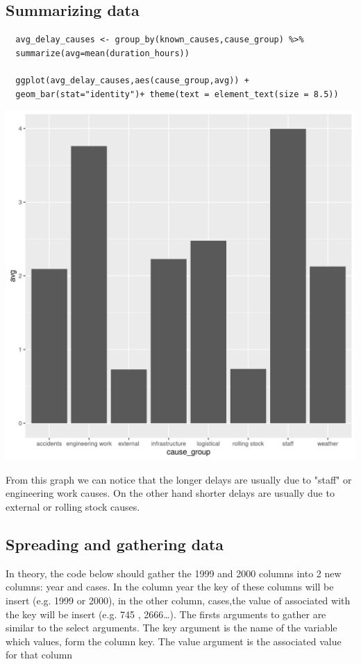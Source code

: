 \documentclass[11pt]{article}
\begin{document}
\subsection{Summarizing data}
\label{sec:org197e537}
\begin{verbatim}
  avg_delay_causes <- group_by(known_causes,cause_group) %>%
  summarize(avg=mean(duration_hours))

  ggplot(avg_delay_causes,aes(cause_group,avg)) +
  geom_bar(stat="identity")+ theme(text = element_text(size = 8.5))
\end{verbatim}

\begin{center}
  \includegraphics[width=.9\linewidth]{avg_delay_causes.jpg}
\end{center}


From this graph we can notice that the longer delays are usually
due to "staff" or engineering work causes. On the other hand
shorter delays are usually due to external or rolling stock causes.

\subsection{Spreading and gathering data}
\label{sec:orga0377ff}

In theory, the code below should gather the 1999 and 2000 columns into 2 new columns:
year and cases. In the column year the key of these columns will be insert (e.g. 1999 or 2000),
in the other column, cases,the value of associated with the key will be insert (e.g. 745 , 2666\ldots{}).
The firsts arguments to gather are similar to the select arguments.
The key argument is the name of the variable which values, form the column key.
The value argument is the associated value for that column
\end{document}
